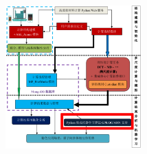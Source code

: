\begin{frame}
\hskip 2pt
\begin{minipage}[b]{0.47\linewidth}
\begin{figure}[h!]
\centering
\includegraphics[height=2.18in]{Figures/MP_comp_BCC.png}
\caption{\fontsize{6.5pt}{4.5pt}\selectfont{适用于异质界面的高通量材料计算自动流程软件架构}}%
\label{MP_comp_BCC}
\end{figure}
\end{minipage}
\end{frame}

